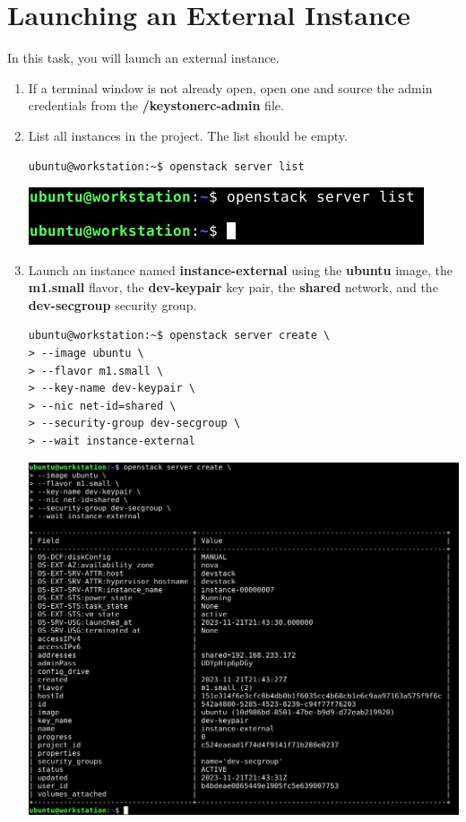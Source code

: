 \documentclass[letterpaper, 12pt]{article}
\begin{document}
\section{Launching an External Instance}
\label{sec:launching_an_external_isntance}
In this task, you will launch an external instance.

\begin{enumerate}
    \item If a terminal window is not already open, open one and source the admin credentials from the 
    \textbf{\texttildemid/keystonerc-admin} file.

    \item List all instances in the project. The list should be empty.
\begin{lstlisting}
ubuntu@workstation:~$ openstack server list
\end{lstlisting}

    \begin{center}
        \includegraphics[width=\linewidth]{images/part5/step2.png}
    \end{center}

    \item Launch an instance named \textbf{instance-external} using the \textbf{ubuntu} image, the \textbf{m1.small}
    flavor, the \textbf{dev-keypair} key pair, the \textbf{shared} network, and the \textbf{dev-secgroup} security
    group.
\begin{lstlisting}
ubuntu@workstation:~$ openstack server create \
> --image ubuntu \
> --flavor m1.small \
> --key-name dev-keypair \
> --nic net-id=shared \
> --security-group dev-secgroup \
> --wait instance-external
\end{lstlisting}

    \begin{center}
        \includegraphics[width=\linewidth]{images/part5/step3.png}
    \end{center}


\end{enumerate}
\end{document}
